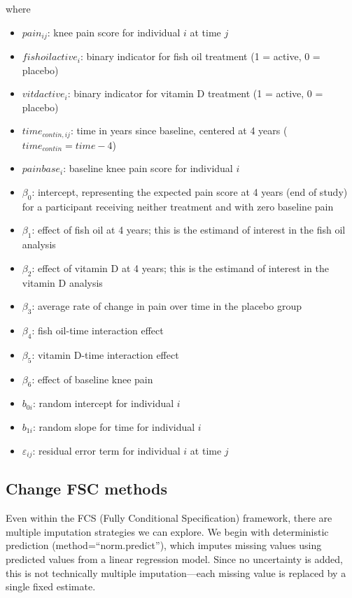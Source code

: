 \documentclass{article}
\providecommand{\tightlist}{%
  \setlength{\itemsep}{0pt}\setlength{\parskip}{0pt}}
\begin{document}
where

\begin{itemize}
\tightlist
\item
  \(pain_{ij}\): knee pain score for individual \(i\) at time \(j\)
\item
  \(fishoilactive_i\): binary indicator for fish oil treatment (1 =
  active, 0 = placebo)
\item
  \(vitdactive_i\): binary indicator for vitamin D treatment (1 =
  active, 0 = placebo)
\item
  \(time_{contin,ij}\): time in years since baseline, centered at 4
  years (\(time_{contin} = time - 4\))
\item
  \(painbase_i\): baseline knee pain score for individual \(i\)
\item
  \(\beta_0\): intercept, representing the expected pain score at 4
  years (end of study) for a participant receiving neither treatment and
  with zero baseline pain
\item
  \(\beta_1\): effect of fish oil at 4 years; this is the estimand of
  interest in the fish oil analysis
\item
  \(\beta_2\): effect of vitamin D at 4 years; this is the estimand of
  interest in the vitamin D analysis
\item
  \(\beta_3\): average rate of change in pain over time in the placebo
  group
\item
  \(\beta_4\): fish oil-time interaction effect
\item
  \(\beta_5\): vitamin D-time interaction effect
\item
  \(\beta_6\): effect of baseline knee pain
\item
  \(b_{0i}\): random intercept for individual \(i\)
\item
  \(b_{1i}\): random slope for time for individual \(i\)
\item
  \(\varepsilon_{ij}\): residual error term for individual \(i\) at time
  \(j\)
\end{itemize}

\subsection{Change FSC methods}\label{change-fsc-methods}

Even within the FCS (Fully Conditional Specification) framework, there
are multiple imputation strategies we can explore. We begin with
deterministic prediction (method=``norm.predict''), which imputes
missing values using predicted values from a linear regression model.
Since no uncertainty is added, this is not technically multiple
imputation---each missing value is replaced by a single fixed estimate.
\end{document}
